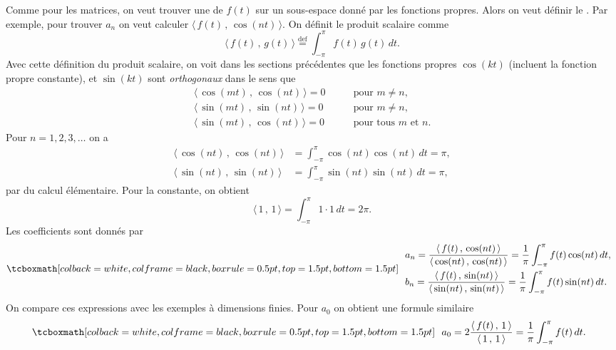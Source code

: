 Comme pour les matrices, on veut trouver une  \emph{}
de $f(t)$ sur un sous-espace donné par les fonctions propres. Alors on veut définir le  \emph{}.  Par exemple, pour trouver $a_n$ on veut calculer $\langle \, f(t) \, , \, \cos (nt) \, \rangle$.
On définit le produit scalaire comme
\begin{equation*}
\langle \, f(t)\, , \, g(t) \, \rangle \overset{\text{def}}{=}
\int_{-\pi}^\pi f(t) \, g(t) \, dt .
\end{equation*}
Avec cette définition du produit scalaire, on voit dans les sections précédentes que les fonctions propres  $\cos (kt)$
(incluent la fonction propre constante), et
$\sin (kt)$ sont \emph{orthogonaux} dans le sens que
\begin{align*}
\langle \, \cos (mt)\, , \, \cos (nt) \, \rangle = 0 & \qquad \text{pour } m \not= n , \\
\langle \, \sin (mt)\, , \, \sin (nt) \, \rangle = 0 & \qquad \text{pour } m \not= n , \\
\langle \, \sin (mt)\, , \, \cos (nt) \, \rangle = 0 & \qquad \text{pour tous } m \text{ et } n .
\end{align*}
Pour $n=1,2,3,\ldots$
on a
\begin{align*}
\langle \, \cos (nt) \, , \, \cos (nt) \, \rangle &=
\int_{-\pi}^\pi \cos(nt)\cos(nt) \, dt
=
\pi,
\\
\langle \, \sin (nt) \, , \, \sin (nt) \, \rangle &=
\int_{-\pi}^\pi \sin(nt)\sin(nt) \, dt
=
\pi,
\end{align*}
par du calcul élémentaire. Pour la constante, on obtient
\begin{equation*}
\langle \, 1 \, , \, 1 \, \rangle
=
\int_{-\pi}^\pi 1 \cdot 1 \, dt
 = 2\pi.
\end{equation*}
Les coefficients sont donnés par
\begin{equation*}
\mybxbg{~~
\begin{aligned}
& a_n =
\frac{\langle \, f(t) \, , \, \cos (nt) \, \rangle}{\langle \, \cos (nt) \, , \,
\cos (nt) \, \rangle}
= 
\frac{1}{\pi} \int_{-\pi}^\pi f(t) \cos (nt) \, dt , \\
& b_n =
\frac{\langle \, f(t) \, , \, \sin (nt) \, \rangle}{\langle \, \sin (nt) \, , \,
\sin (nt) \, \rangle}
= 
\frac{1}{\pi} \int_{-\pi}^\pi f(t) \sin (nt) \, dt .
\end{aligned}
~~}
\end{equation*}
On compare ces expressions avec les exemples à dimensions finies. 
Pour $a_0$ on obtient une formule similaire
\begin{equation*}
\mybxbg{~~
a_0 = 2
\frac{\langle \, f(t) \, , \, 1 \, \rangle}{\langle \, 1 \, , \,
1 \, \rangle}
=
\frac{1}{\pi} \int_{-\pi}^\pi f(t) \, dt .
~~}
\end{equation*}

